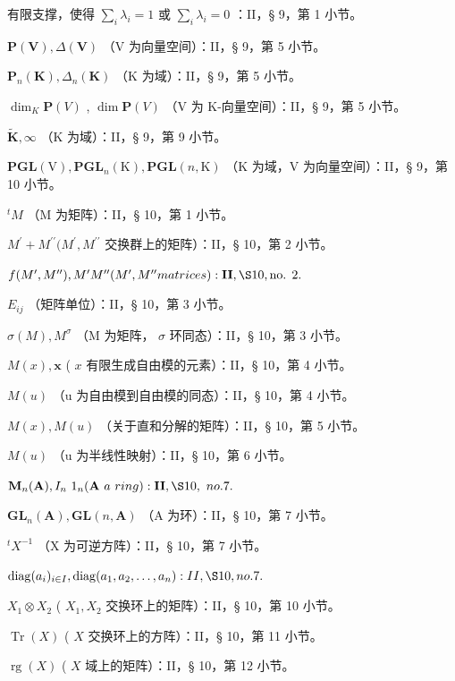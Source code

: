 有限支撑，使得 \(\sum_{i} \lambda_{i} = 1\) 或 \(\sum_{i} \lambda_{i} = 0\) ：II，§ 9，第 1 小节。

\(\mathbf{P}(\mathbf{V}), \Delta(\mathbf{V})\) （V 为向量空间）：II，§ 9，第 5 小节。

\(\mathbf{P}_n(\mathbf{K}), \Delta_n(\mathbf{K})\) （K 为域）：II，§ 9，第 5 小节。

\(\dim_{K} \mathbf{P}(V)\) , \(\dim \mathbf{P}(V)\) （V 为 K-向量空间）：II，§ 9，第 5 小节。

\(\tilde{\mathbf{K}}, \infty\) （K 为域）：II，§ 9，第 9 小节。

\(\mathbf{PGL}(\mathrm{V}), \mathbf{PGL}_n(\mathrm{K}), \mathbf{PGL}(n, \mathrm{K})\) （K 为域，V 为向量空间）：II，§ 9，第 10 小节。

\(^{t}M\) （M 为矩阵）：II，§ 10，第 1 小节。

\(M^{\prime} + M^{\prime \prime}(M^{\prime},M^{\prime \prime}\) 交换群上的矩阵）：II，§ 10，第 2 小节。

\(f(M', M''), M'M'' (M', M'' matrices): \mathbf{II}, \S 10, \text{no. } 2.\)

\(E_{ij}\) （矩阵单位）：II，§ 10，第 3 小节。

\(\sigma(M), M^{\sigma}\) （M 为矩阵， \(\sigma\) 环同态）：II，§ 10，第 3 小节。

\(M(x), \mathbf{x}\) ( \(x\) 有限生成自由模的元素）：II，§ 10，第 4 小节。

\(M(u)\) （u 为自由模到自由模的同态）：II，§ 10，第 4 小节。

\(M(x), M(u)\) （关于直和分解的矩阵）：II，§ 10，第 5 小节。

\(M(u)\) （u 为半线性映射）：II，§ 10，第 6 小节。

\(\mathbf{M}_{n}(\mathbf{A}), I_{n} \ 1_{n} (\mathbf{A} \ a \ ring): \mathbf{II}, \S 10, \ no. 7.\)

\(\mathbf{GL}_n(\mathbf{A}), \mathbf{GL}(n, \mathbf{A})\) （A 为环）：II，§ 10，第 7 小节。

\(^{t}X^{-1}\) （X 为可逆方阵）：II，§ 10，第 7 小节。

\(\operatorname{diag}(a_{i})_{i \in I}, \operatorname{diag}(a_{1}, a_{2}, \ldots, a_{n}) : II, \S 10, no. 7.\)

\(X_{1} \otimes X_{2}\) ( \(X_{1}, X_{2}\) 交换环上的矩阵）：II，§ 10，第 10 小节。

\(\operatorname{Tr}(X)\) ( \(X\) 交换环上的方阵）：II，§ 10，第 11 小节。

\(\operatorname{rg}(X)\) ( \(X\) 域上的矩阵）：II，§ 10，第 12 小节。

